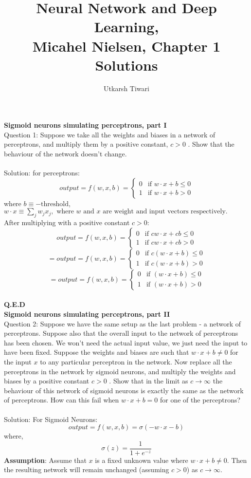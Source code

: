 \documentclass[18pt]{article}
\title{Neural Network and Deep Learning, \\ Micahel Nielsen, Chapter 1 \\Solutions}
\author{Utkarsh Tiwari}
\date{}
\begin{document}
\maketitle

\textbf{Sigmoid neurons simulating perceptrons, part I} \\
Question 1: Suppose we take all the weights and biases in a network of perceptrons, and multiply them by a positive constant, $c>0$
. Show that the behaviour of the network doesn't change. \\ \\
Solution: for perceptrons: $$
output=f(w,x,b)=
\begin{cases}
0 & \text{if } w\cdot x+b \leq 0 \\
1 & \text{if } w\cdot x+b > 0
\end{cases}
$$ 
where $b \equiv -\text{threshold}$,
$w \cdot x \equiv \sum_{j} w_j x_j, \text{ where } w \text{ and } x \text{ are weight and input vectors respectively.}$
\\
After multiplying with a positive constant $c>0$: $$
output=f(w,x,b)=
\begin{cases}
0 & \text{if } cw\cdot x+cb \leq 0 \\
1 & \text{if } cw\cdot x+cb > 0
\end{cases}
$$
$$
=output=f(w,x,b)=
\begin{cases}
0 & \text{if } c(w\cdot x+b) \leq 0 \\
1 & \text{if } c(w\cdot x+b) > 0
\end{cases}
$$
$$
=output=f(w,x,b)=
\begin{cases}
0 & \text{if } (w\cdot x+b) \leq 0 \\
1 & \text{if } (w\cdot x+b) > 0
\end{cases}
$$
\\
\textbf{Q.E.D}
\\

\textbf{Sigmoid neurons simulating perceptrons, part II} \\

Question 2: Suppose we have the same setup as the last problem - a network of perceptrons. Suppose also that the overall input to the network of perceptrons has been chosen. We won't need the actual input value, we just need the input to have been fixed. Suppose the weights and biases are such that $w \cdot x + b \neq 0$
 for the input $x$ to any particular perceptron in the network. Now replace all the perceptrons in the network by sigmoid neurons, and multiply the weights and biases by a positive constant $c>0$
. Show that in the limit as $c \rightarrow \infty$
 the behaviour of this network of sigmoid neurons is exactly the same as the network of perceptrons. How can this fail when $w⋅x+b=0$
 for one of the perceptrons? \\ \\
Solution: For Sigmoid Neurons:
$$
output=f(w,x,b)= \sigma(-w\cdot x-b)
$$ 
where, $$
\sigma(z)=\frac{1}{1 + e^{-z}}
$$
\textbf{Assumption}:
Assume that $x$ is a fixed unknown value where $w \cdot x + b \neq 0$. Then the resulting network will remain unchanged (assuming $c > 0$) as $c \rightarrow \infty$.
\end{document}
